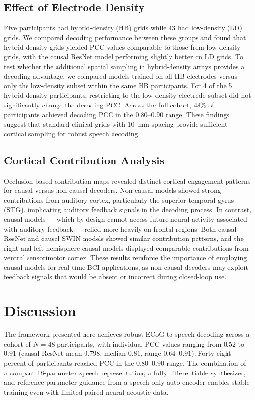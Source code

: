 \documentclass[10pt]{article}
\begin{document}
\subsection{Effect of Electrode Density}

Five participants had hybrid-density (HB) grids while 43 had low-density (LD) grids. We compared decoding performance between these groups and found that hybrid-density grids yielded PCC values comparable to those from low-density grids, with the causal ResNet model performing slightly better on LD grids. To test whether the additional spatial sampling in hybrid-density arrays provides a decoding advantage, we compared models trained on all HB electrodes versus only the low-density subset within the same HB participants. For 4 of the 5 hybrid-density participants, restricting to the low-density electrode subset did not significantly change the decoding PCC. Across the full cohort, 48\% of participants achieved decoding PCC in the $0.80$--$0.90$ range. These findings suggest that standard clinical grids with 10~mm spacing provide sufficient cortical sampling for robust speech decoding.

\subsection{Cortical Contribution Analysis}

Occlusion-based contribution maps revealed distinct cortical engagement patterns for causal versus non-causal decoders. Non-causal models showed strong contributions from auditory cortex, particularly the superior temporal gyrus (STG), implicating auditory feedback signals in the decoding process. In contrast, causal models --- which by design cannot access future neural activity associated with auditory feedback --- relied more heavily on frontal regions. Both causal ResNet and causal SWIN models showed similar contribution patterns, and the right and left hemisphere causal models displayed comparable contributions from ventral sensorimotor cortex. These results reinforce the importance of employing causal models for real-time BCI applications, as non-causal decoders may exploit feedback signals that would be absent or incorrect during closed-loop use.

\section{Discussion}

The framework presented here achieves robust ECoG-to-speech decoding across a cohort of $N=48$ participants, with individual PCC values ranging from $0.52$ to $0.91$ (causal ResNet mean $0.798$, median $0.81$, range $0.64$--$0.91$). Forty-eight percent of participants reached PCC in the $0.80$--$0.90$ range. The combination of a compact 18-parameter speech representation, a fully differentiable synthesizer, and reference-parameter guidance from a speech-only auto-encoder enables stable training even with limited paired neural-acoustic data.
\end{document}
